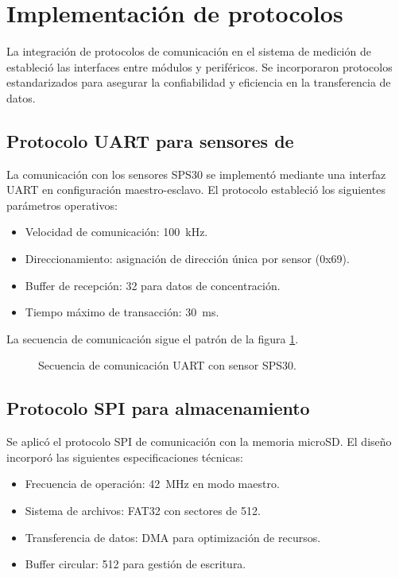 	

\section{Implementación de protocolos}

La integración de protocolos de comunicación en el sistema de medición de \MPF estableció las interfaces entre módulos y periféricos. Se incorporaron protocolos estandarizados para asegurar la confiabilidad y eficiencia en la transferencia de datos.

\subsection{Protocolo UART para sensores de \MPF}
La comunicación con los sensores SPS30 se implementó mediante una interfaz UART en configuración maestro-esclavo. El protocolo estableció los siguientes parámetros operativos:

\begin{itemize}
	\item Velocidad de comunicación: \SI{100}{\kilo\hertz}.
	\item Direccionamiento: asignación de dirección única por sensor (0x69).
	\item Buffer de recepción: \SI{32}{\byte} para datos de concentración.
	\item Tiempo máximo de transacción: \SI{30}{\milli\second}.
\end{itemize}

La secuencia de comunicación sigue el  patrón de la figura \ref{fig:i2c_sequence}.

\begin{figure}[h]
	\centering
	\small
	
	\caption{Secuencia de comunicación UART con sensor SPS30.}
	\label{fig:i2c_sequence}
\end{figure}

\subsection{Protocolo SPI para almacenamiento}
Se aplicó el protocolo SPI de comunicación con la memoria microSD. El diseño incorporó las siguientes especificaciones técnicas:

\begin{itemize}
	\item Frecuencia de operación: \SI{42}{\mega\hertz} en modo maestro.
	\item Sistema de archivos: FAT32 con sectores de \SI{512}{\byte}.
	\item Transferencia de datos: DMA para optimización de recursos.
	\item Buffer circular: \SI{512}{\byte} para gestión de escritura.
\end{itemize}

